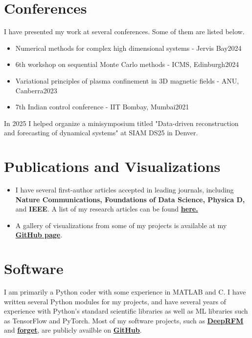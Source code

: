 \documentclass[a4paper, 11pt]{article}
\begin{document}
\section*{Conferences}
I have presented my work at several conferences. Some of them are listed below.
\begin{itemize}
    \item Numerical methods for complex high dimensional systems - Jervis Bay\hfill2024
    \item 6th workshop on sequential Monte Carlo methods - ICMS, Edinburgh\hfill2024
    \item Variational principles of plasma confinement in 3D magnetic fields - ANU, Canberra\hfill 2023
    \item 7th Indian control conference - IIT Bombay, Mumbai\hfill 2021
\end{itemize}
In 2025 I helped organize a minisymposium titled "Data-driven reconstruction and forecasting of dynamical systems" at SIAM DS25 in Denver.

\section*{Publications and Visualizations}
\begin{itemize}
    \item I have several first-author articles accepted in leading journals, including \textbf{Nature Communications, Foundations of Data Science, Physica D,} and \textbf{IEEE}. A list of my research articles can be found \textbf{\href{https://pinakm9.github.io/_pages/publications.html}{\color{linkblue}here.}}
    \item A gallery of visualizations from some of my projects is available at my \textbf{\href{https://pinakm9.github.io/gallery22/}{\color{linkblue}GitHub page}}.
\end{itemize}

\section*{Software}
I am primarily a Python coder with some experience in MATLAB and C. I have written several Python modules for my projects, and have several years of experience with Python's standard scientific libraries as well as ML libraries such as TensorFlow and PyTorch. Most of my software projects, such as \textbf{\href{https://github.com/pinakm9/DeepRFM}{DeepRFM}} and \textbf{\href{https://github.com/pinakm9/forget}{forget}}, are publicly availble on \textbf{\href{https://github.com/pinakm9}{\color{linkblue}GitHub}}.
\end{document}
